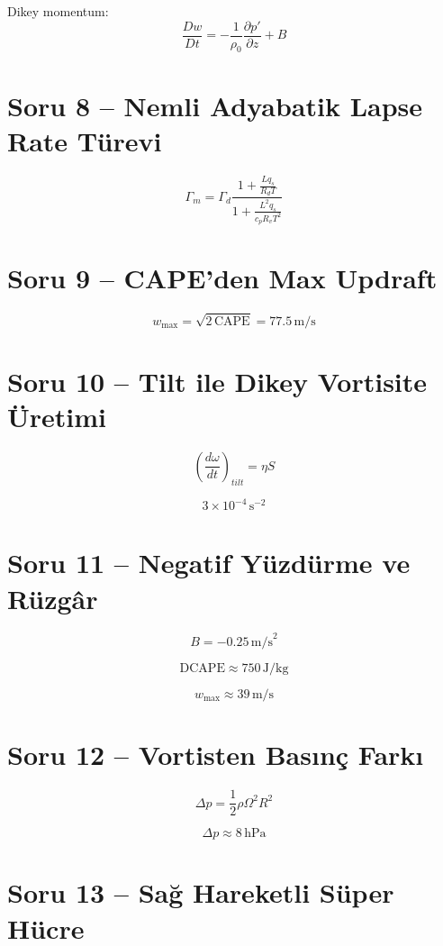 \documentclass[12pt,a4paper]{article}
\begin{document}
Dikey momentum:
\[
\frac{Dw}{Dt} = -\frac{1}{\rho_0} \frac{\partial p'}{\partial z} + B
\]

\section*{Soru 8 -- Nemli Adyabatik Lapse Rate Türevi}

\[
\Gamma_m = \Gamma_d 
\frac{1 + \frac{L q_s}{R_d T}}
     {1 + \frac{L^2 q_s}{c_p R_v T^2}}
\]

\section*{Soru 9 -- CAPE'den Max Updraft}

\[
w_{\max} = \sqrt{2\,\text{CAPE}} = 77.5\, \text{m/s}
\]

\section*{Soru 10 -- Tilt ile Dikey Vortisite Üretimi}

\[
\left(\frac{d\omega}{dt}\right)_{tilt} = \eta S
\]

\[
3\times 10^{-4} \, \text{s}^{-2}
\]

\section*{Soru 11 -- Negatif Yüzdürme ve Rüzgâr}

\[
B = -0.25 \, \text{m/s}^2
\]

\[
\text{DCAPE} \approx 750\, \text{J/kg}
\]

\[
w_{\max} \approx 39\, \text{m/s}
\]

\section*{Soru 12 -- Vortisten Basınç Farkı}

\[
\Delta p = \frac{1}{2} \rho \Omega^2 R^2
\]

\[
\Delta p \approx 8 \, \text{hPa}
\]

\section*{Soru 13 -- Sağ Hareketli Süper Hücre}
\end{document}
